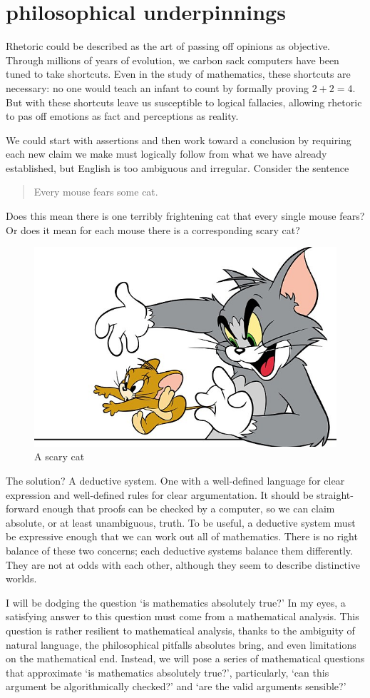 \documentclass{scrbook}
\begin{document}
\tableofcontents{}
\chapter[Philosophical Underpinnings]{philosophical underpinnings}
Rhetoric could be described as the art of passing off opinions as objective. Through millions of years of evolution, we carbon sack computers have been tuned to take shortcuts. Even in the study of mathematics, these shortcuts are necessary: no one would teach an infant to count by formally proving $2+2=4$. But with these shortcuts leave us susceptible to logical fallacies, allowing rhetoric to pas off emotions as fact and perceptions as reality.

We could start with assertions and then work toward a conclusion by requiring each new claim we make must logically follow from what we have already established, but English is too ambiguous and irregular. Consider the sentence
\begin{quote}
  Every mouse fears some cat.
\end{quote}
Does this mean there is one terribly frightening cat that every single mouse fears? Or does it mean for each mouse there is a corresponding scary cat? \cite{wiki:cat-gen}
\begin{figure}
  \centering
  \includegraphics[width=.5\textwidth]{images/tom-jerry}
  \caption{A scary cat }
\end{figure}

The solution? A deductive system. One with a well-defined language for clear expression and well-defined rules for clear argumentation. It should be straight-forward enough that proofs can be checked by a computer, so we can claim absolute, or at least unambiguous, truth. To be useful, a deductive system must be expressive enough that we can work out all of mathematics. There is no right balance of these two concerns; each deductive systems balance them differently. They are not at odds with each other, although they seem to describe distinctive worlds. 

I will be dodging the question `is mathematics absolutely true?' In my eyes, a satisfying answer to this question must come from a mathematical analysis. This question is rather resilient to mathematical analysis, thanks to the ambiguity of natural language, the philosophical pitfalls absolutes bring, and even limitations on the mathematical end. Instead, we will pose a series of mathematical questions that approximate `is mathematics absolutely true?', particularly, `can this argument be algorithmically checked?' and `are the valid arguments sensible?'
\end{document}
